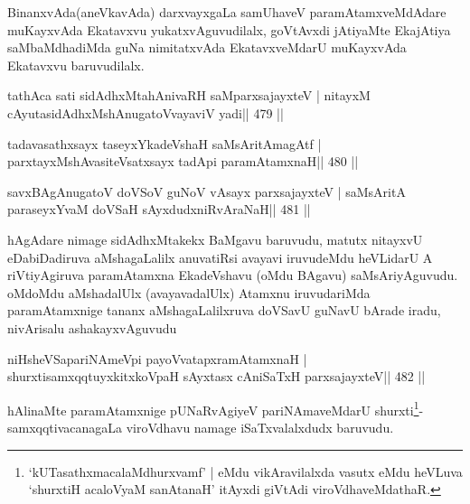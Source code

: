 \begin{artha}
BinanxvAda(aneVkavAda) darxvayxgaLa samUhaveV paramAtamxveMdAdare muKayxvAda Ekatavxvu yukatxvAguvudilalx, goVtAvxdi jAtiyaMte EkajAtiya saMbaMdhadiMda guNa nimitatxvAda EkatavxveMdarU muKayxvAda Ekatavxvu baruvudilalx.
\end{artha}



\begin{shl}
tathAca sati sidAdhxMtahAnivaRH saMparxsajayxteV |
nitayxM cAyutasidAdhxMshAnugatoV\s vayaviV yadi\hfill || 479 ||
\end{shl}

\begin{shl}
tadavasathxsayx taseyxYkadeVshaH saMsAritAmagAtf |
parxtayxMshAvasiteVsatxsayx tadA\s pi paramAtamxnaH\hfill || 480 ||
\end{shl}

\begin{shl}
savxBAgAnugatoV doVSoV guNoV vA\s sayx parxsajayxteV |
saMsAritA paraseyxYvaM doVSaH sAyxdudxniRvAraNaH\hfill || 481 ||
\end{shl}

\begin{artha}
hAgAdare nimage sidAdhxMtakekx BaMgavu baruvudu, matutx nitayxvU
eDabiDadiruva aMshagaLalilx anuvatiRsi avayavi iruvudeMdu heVLidarU A
riVtiyAgiruva paramAtamxna EkadeVshavu (oMdu BAgavu) saMsAriyAguvudu.
oMdoMdu aMshadalUlx (avayavadalUlx) Atamxnu iruvudariMda
paramAtamxnige tananx aMshagaLalilxruva doVSavU guNavU bArade iradu,
nivArisalu ashakayxvAguvudu
\end{artha}


\begin{shl}
niHsheVSapariNAmeV\s pi payoVvatapxramAtamxnaH |
shurxtisamxqqtuyxkitxkoVpaH sAyxtasx cAniSaTxH parxsajayxteV\hfill || 482 ||
\end{shl}

\begin{artha}
hAlinaMte paramAtamxnige pUNaRvAgiyeV pariNAmaveMdarU shurxti\footnote{`kUTasathxmacalaMdhurxvamf' | eMdu vikAravilalxda vasutx eMdu heVLuva `shurxtiH acaloV\s yaM sanAtanaH' itAyxdi giVtAdi viroVdhaveMdathaR.}-samxqqtivacanagaLa viroVdhavu namage iSaTxvalalxdudx baruvudu.
\end{artha}



